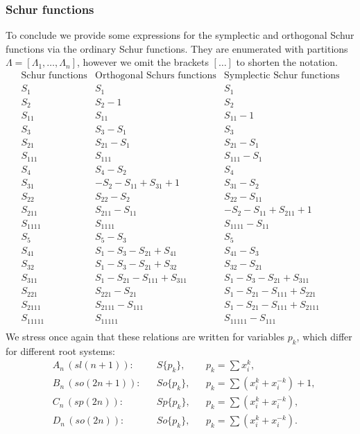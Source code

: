 \documentclass{article}
\begin{document}
\subsubsection{Schur functions}
To conclude we provide some expressions for the symplectic and orthogonal Schur functions via the ordinary Schur functions. They are enumerated with partitions $\Lambda = [\Lambda_1, \dots, \Lambda_n]$, however we omit the brackets $[\dots]$ to shorten the notation.
\begin{equation}
\begin{array}{l|l|l}
\text{Schur functions} & \text{Orthogonal Schurs functions} & \text{Symplectic Schur functions} \\
 S_1 & S_1 & S_1 \\
 S_2 & S_2-1 & S_2 \\
 S_{11} & S_{11} & S_{11}-1 \\
 S_3 & S_3-S_1 & S_3 \\
 S_{21} & S_{21}-S_1 & S_{21}-S_1 \\
 S_{111} & S_{111} & S_{111}-S_1 \\
 S_4 & S_4-S_2 & S_4 \\
 S_{31} & -S_2-S_{11}+S_{31}+1 & S_{31}-S_2 \\
 S_{22} & S_{22}-S_2 & S_{22}-S_{11} \\
 S_{211} & S_{211}-S_{11} & -S_2-S_{11}+S_{211}+1 \\
 S_{1111} & S_{1111} & S_{1111}-S_{11} \\
 S_5 & S_5-S_3 & S_5 \\
 S_{41} & S_1-S_3-S_{21}+S_{41} & S_{41}-S_3 \\
 S_{32} & S_1-S_3-S_{21}+S_{32} & S_{32}-S_{21} \\
 S_{311} & S_1-S_{21}-S_{111}+S_{311} & S_1-S_3-S_{21}+S_{311} \\
 S_{221} & S_{221}-S_{21} & S_1-S_{21}-S_{111}+S_{221} \\
 S_{2111} & S_{2111}-S_{111} & S_1-S_{21}-S_{111}+S_{2111} \\
 S_{11111} & S_{11111} & S_{11111}-S_{111} \\
\end{array}
\end{equation}
We stress once again that these relations are written for variables $p_k$, which differ for different root systems:
\begin{align}
   & A_n\, (sl(n+1)):  &&\!\!\!\!\!\!\!\!\!\!\!\!\!\!\!\!\!\!\!\!\!\!\!\! S\{p_k\},  && \!\!\!\!\!\!\!\!\!\!\!\!\!\!\!\!\!\!\!\!\!\!\!\! p_k = \sum x_i^k, \label{schurA}\\
   & B_n\, (so(2n+1)):  && \!\!\!\!\!\!\!\!\!\!\!\!\!\!\!\!\!\!\!\!\!\!\!\! So\{p_k\}, && \!\!\!\!\!\!\!\!\!\!\!\!\!\!\!\!\!\!\!\!\!\!\!\! p_k = \sum (x_i^k+x_i^{-k}) + 1, \label{schurB} \\
   & C_n\, (sp(2n)): && \!\!\!\!\!\!\!\!\!\!\!\!\!\!\!\!\!\!\!\!\!\!\!\! Sp\{p_k\}, && \!\!\!\!\!\!\!\!\!\!\!\!\!\!\!\!\!\!\!\!\!\!\!\!p_k = \sum (x_i^k+x_i^{-k}) , \label{schurC}\\
   & D_n\, (so(2n)): && \!\!\!\!\!\!\!\!\!\!\!\!\!\!\!\!\!\!\!\!\!\!\!\! So\{p_k\}, && \!\!\!\!\!\!\!\!\!\!\!\!\!\!\!\!\!\!\!\!\!\!\!\! p_k = \sum (x_i^k+x_i^{-k}). \label{schurD}
\end{align}
\end{document}
